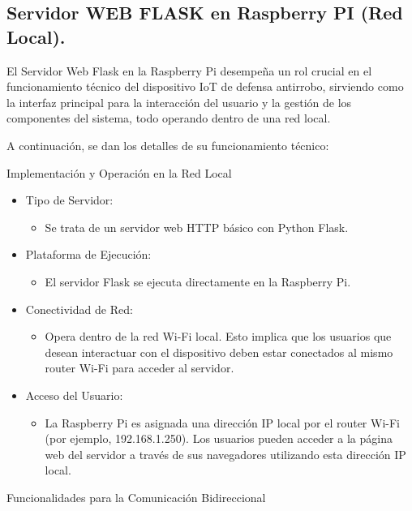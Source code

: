 \documentclass{report}
\begin{document}
\subsection{Servidor WEB FLASK en Raspberry PI (Red Local).}
El Servidor Web Flask en la Raspberry Pi desempeña un rol crucial en el funcionamiento técnico del dispositivo IoT de defensa antirrobo, 
sirviendo como la interfaz principal para la interacción del usuario y la gestión de los componentes del sistema, todo operando dentro de una red local.

A continuación, se dan los detalles de su funcionamiento técnico:

Implementación y Operación en la Red Local
\begin{itemize}
    \item Tipo de Servidor: 
    \begin{itemize}
        \item Se trata de un servidor web HTTP básico con Python Flask.
    \end{itemize}

    \item Plataforma de Ejecución: 
    \begin{itemize}
        \item El servidor Flask se ejecuta directamente en la Raspberry Pi.
    \end{itemize}
    
    \item Conectividad de Red: 
    \begin{itemize}
        \item Opera dentro de la red Wi-Fi local. Esto implica que los usuarios que desean interactuar con el dispositivo deben estar 
        conectados al mismo router Wi-Fi para acceder al servidor.
    \end{itemize}

    \item Acceso del Usuario: 
    \begin{itemize}
        \item La Raspberry Pi es asignada una dirección IP local por el router Wi-Fi (por ejemplo, 192.168.1.250). Los usuarios 
        pueden acceder a la página web del servidor a través de sus navegadores utilizando esta dirección IP local.
    \end{itemize}
\end{itemize}

Funcionalidades para la Comunicación Bidireccional
\end{document}
